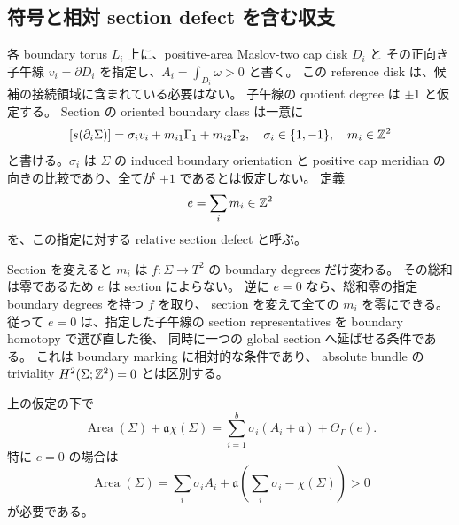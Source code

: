 \subsection{符号と相対 section defect を含む収支}

各 boundary torus $L_i$ 上に、positive-area Maslov-two cap disk $D_i$ と
その正向き子午線 $v_i=\partial D_i$ を指定し、$A_i=\int_{D_i}\omega>0$ と書く。
この reference disk は、候補の接続領域に含まれている必要はない。
子午線の quotient degree は $\pm1$ と仮定する。
Section の oriented boundary class は一意に
\begin{equation}\label{rsb:boundary-data}
 [s(\partial_i\Sigma)]=\sigma_i v_i+m_{i1}\Gamma_1+m_{i2}\Gamma_2,
 \quad \sigma_i\in\{1,-1\},\quad m_i\in\mathbb Z^2
\end{equation}
と書ける。$\sigma_i$ は $\Sigma$ の induced boundary orientation と
positive cap meridian の向きの比較であり、全てが $+1$ であるとは仮定しない。
定義
\begin{equation}\label{rsb:defect}
 e=\sum_i m_i\in\mathbb Z^2
\end{equation}
を、この指定に対する relative section defect と呼ぶ。

Section を変えると $m_i$ は $f:\Sigma\to T^2$ の boundary degrees だけ変わる。
その総和は零であるため $e$ は section によらない。
逆に $e=0$ なら、総和零の指定 boundary degrees を持つ $f$ を取り、
section を変えて全ての $m_i$ を零にできる。
従って $e=0$ は、指定した子午線の section representatives を boundary homotopy で選び直した後、
同時に一つの global section へ延ばせる条件である。
これは boundary marking に相対的な条件であり、
absolute bundle の triviality $H^2(\Sigma;\mathbb Z^2)=0$ とは区別する。

\begin{theorem}\label{rsb:budget}
上の仮定の下で
\begin{equation}\label{rsb:full-budget}
 \boxed{\quad
 \operatorname{Area}(\Sigma)+\mathfrak a\chi(\Sigma)
 =\sum_{i=1}^b\sigma_i(A_i+\mathfrak a)+\Theta_\Gamma(e).
 \quad}
\end{equation}
特に $e=0$ の場合は
\begin{equation}\label{rsb:untwisted-budget}
 \operatorname{Area}(\Sigma)
 =\sum_i\sigma_i A_i+\mathfrak a\left(\sum_i\sigma_i-\chi(\Sigma)\right)>0
\end{equation}
が必要である。
\end{theorem}

